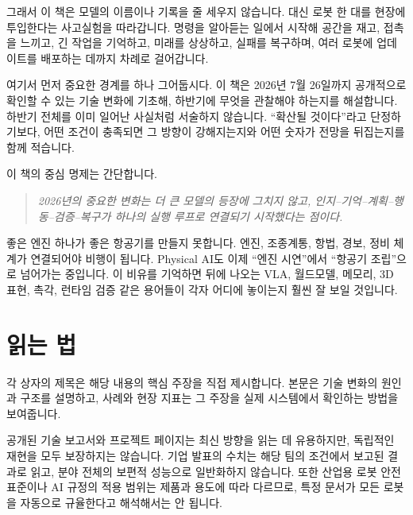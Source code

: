 \documentclass[11pt,openany]{book}
\begin{document}
그래서 이 책은 모델의 이름이나 기록을 줄 세우지 않습니다. 대신 로봇 한 대를 현장에 투입한다는 사고실험을 따라갑니다. 명령을 알아듣는 일에서 시작해 공간을 재고, 접촉을 느끼고, 긴 작업을 기억하고, 미래를 상상하고, 실패를 복구하며, 여러 로봇에 업데이트를 배포하는 데까지 차례로 걸어갑니다.

\begin{profbox}
여기서 먼저 중요한 경계를 하나 그어둡시다. 이 책은 2026년 7월 26일까지 공개적으로 확인할 수 있는 기술 변화에 기초해, 하반기에 무엇을 관찰해야 하는지를 해설합니다. 하반기 전체를 이미 일어난 사실처럼 서술하지 않습니다. ``확산될 것이다''라고 단정하기보다, 어떤 조건이 충족되면 그 방향이 강해지는지와 어떤 숫자가 전망을 뒤집는지를 함께 적습니다.
\end{profbox}

이 책의 중심 명제는 간단합니다.

\begin{quote}
\large\itshape
2026년의 중요한 변화는 더 큰 모델의 등장에 그치지 않고, 인지--기억--계획--행동--검증--복구가 하나의 실행 루프로 연결되기 시작했다는 점이다.
\end{quote}

좋은 엔진 하나가 좋은 항공기를 만들지 못합니다. 엔진, 조종계통, 항법, 경보, 정비 체계가 연결되어야 비행이 됩니다. Physical AI도 이제 ``엔진 시연''에서 ``항공기 조립''으로 넘어가는 중입니다. 이 비유를 기억하면 뒤에 나오는 VLA, 월드모델, 메모리, 3D 표현, 촉각, 런타임 검증 같은 용어들이 각자 어디에 놓이는지 훨씬 잘 보일 것입니다.

\section*{읽는 법}

각 상자의 제목은 해당 내용의 핵심 주장을 직접 제시합니다. 본문은 기술 변화의 원인과 구조를 설명하고, 사례와 현장 지표는 그 주장을 실제 시스템에서 확인하는 방법을 보여줍니다.

\begin{cautionbox}[공개 자료의 근거 범위]
공개된 기술 보고서와 프로젝트 페이지는 최신 방향을 읽는 데 유용하지만, 독립적인 재현을 모두 보장하지는 않습니다. 기업 발표의 수치는 해당 팀의 조건에서 보고된 결과로 읽고, 분야 전체의 보편적 성능으로 일반화하지 않습니다. 또한 산업용 로봇 안전 표준이나 AI 규정의 적용 범위는 제품과 용도에 따라 다르므로, 특정 문서가 모든 로봇을 자동으로 규율한다고 해석해서는 안 됩니다.
\end{cautionbox}

\tableofcontents
\cleardoublepage
\end{document}
